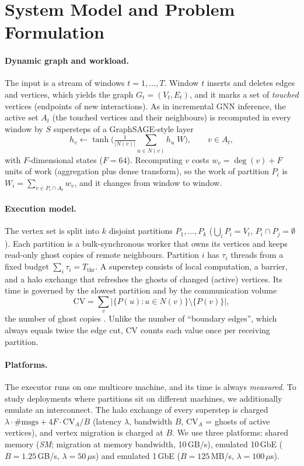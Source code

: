 \section{System Model and Problem Formulation}\label{sec:model}

\paragraph{Dynamic graph and workload.}
The input is a stream of windows $t=1,\dots,T$. Window $t$ inserts and deletes edges and
vertices, which yields the graph $G_t=(V_t,E_t)$, and it marks a set of \emph{touched} vertices
(endpoints of new interactions). As in incremental GNN inference, the active set $A_t$ (the
touched vertices and their neighbours) is recomputed in every window by $S$ supersteps of a
GraphSAGE-style layer
\begin{equation}\label{eq:layer}
  h_v \leftarrow \tanh\Big(\tfrac{1}{|N(v)|}\textstyle\sum_{u\in N(v)} h_u \; W\Big), \qquad v\in A_t,
\end{equation}
with $F$-dimensional states ($F=64$). Recomputing $v$ costs $w_v=\deg(v)+F$ units of work
(aggregation plus dense transform), so the work of partition $P_i$ is
$W_i=\sum_{v\in P_i\cap A_t} w_v$, and it changes from window to window.

\paragraph{Execution model.}
The vertex set is split into $k$ disjoint partitions $P_1,\dots,P_k$
($\bigcup_i P_i=V_t$, $P_i\cap P_j=\emptyset$). Each partition is a bulk-synchronous worker
\cite{malewicz2010pregel} that owns its vertices and keeps read-only ghost copies of remote
neighbours. Partition $i$ has $\tau_i$ threads from a fixed budget $\sum_i\tau_i=T_{\mathrm{thr}}$.
A superstep consists of local computation, a barrier, and a halo exchange that refreshes the
ghosts of changed (active) vertices. Its time is governed by the slowest partition and by the
communication volume
\begin{equation}\label{eq:cv}
  \mathrm{CV} = \sum_{v} \big|\{P(u): u\in N(v)\}\setminus\{P(v)\}\big|,
\end{equation}
the number of ghost copies \cite{hendrickson2000models}. Unlike the number of ``boundary
edges'', which always equals twice the edge cut, CV counts each value once per receiving
partition.

\paragraph{Platforms.}
The executor runs on one multicore machine, and its time is always \emph{measured}. To study
deployments where partitions sit on different machines, we additionally emulate an
interconnect. The halo exchange of every superstep is charged
$\lambda\cdot\#\mathrm{msgs}+4F\cdot\mathrm{CV}_{A}/B$ (latency $\lambda$, bandwidth $B$,
$\mathrm{CV}_A$ = ghosts of active vertices), and vertex migration is charged at $B$. We use three
platforms: shared memory (\emph{SM}; migration at memory bandwidth, 10\,GB/s), emulated
10\,GbE ($B=1.25$\,GB/s, $\lambda=50\,\mu$s) and emulated 1\,GbE ($B=125$\,MB/s, $\lambda=100\,\mu$s).

